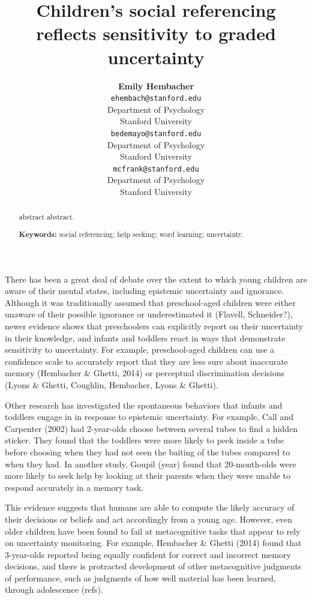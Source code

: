 \documentclass[10pt, letterpaper]{article}
\title{Children's social referencing reflects sensitivity to graded uncertainty}
\author{{\large \bf Emily  Hembacher} \\ \texttt{ehembach@stanford.edu} \\ Department of Psychology \\ Stanford University \And {\large \bf Benjamin deMayo} \\ \texttt{bedemayo@stanford.edu} \\ Department of Psychology \\ Stanford University \And {\large \bf Michael C. Frank} \\ \texttt{mcfrank@stanford.edu} \\ Department of Psychology \\ Stanford University}
\begin{document}
\maketitle

\begin{abstract}
abstract abstract.

\textbf{Keywords:}
social referencing; help seeking; word learning; uncertainty.
\end{abstract}

There has been a great deal of debate over the extent to which young
children are aware of their mental states, including epistemic
uncertainty and ignorance. Although it was traditionally assumed that
preschool-aged children were either unaware of their possible ignorance
or underestimated it (Flavell, Schneider?), newer evidence shows that
preschoolers can explicitly report on their uncertainty in their
knowledge, and infants and toddlers react in ways that demonstrate
sensitivity to uncertainty. For example, preschool-aged children can use
a confidence scale to accurately report that they are less sure about
inaccurate memory (Hembacher \& Ghetti, 2014) or perceptual
discrimination decisions (Lyons \& Ghetti, Coughlin, Hembacher, Lyons \&
Ghetti).

Other research has investigated the spontaneous behaviors that infants
and toddlers engage in in response to epistemic uncertainty. For
example, Call and Carpenter (2002) had 2-year-olds choose between
several tubes to find a hidden sticker. They found that the toddlers
were more likely to peek inside a tube before choosing when they had not
seen the baiting of the tubes compared to when they had. In another
study, Goupil (year) found that 20-month-olds were more likely to seek
help by looking at their parents when they were unable to respond
accurately in a memory task.

This evidence suggests that humans are able to compute the likely
accuracy of their decisions or beliefs and act accordingly from a young
age. However, even older children have been found to fail at
metacognitive tasks that appear to rely on uncertainty monitoring. For
example, Hembacher \& Ghetti (2014) found that 3-year-olds reported
being equally confident for correct and incorrect memory decisions, and
there is protracted development of other metacognitive judgments of
performance, such as judgments of how well material has been learned,
through adolescence (refs).
\end{document}

